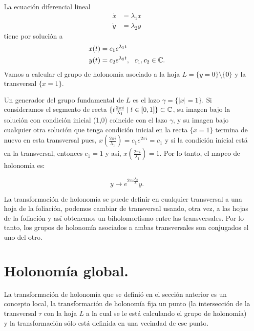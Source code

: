 \begin{Ejemplo}
\label{Ej:HolonomiaLineal}
La ecuación diferencial lineal
\begin{equation*}
\begin{aligned}
\dot{x} &= \lambda_{1}x\\
\dot{y} &= \lambda_{2}y
\end{aligned}
\end{equation*}
tiene por solución a 
\begin{equation*}
\begin{aligned}
x(t) &= c_{1}e^{\lambda_{1}t}\\
y(t) &= c_{2}e^{\lambda_{2}t},\ \  c_{1},c_{2}\in\mathbb{C}.
\end{aligned}
\end{equation*}
Vamos a calcular el grupo de holonomía asociado a la hoja $L=\{y=0\}\setminus\{0\}$ y la transversal $\{x=1\}$.

Un generador del grupo fundamental de $L$ es el lazo $\gamma=\{\left|x\right| = 1\}$. Si consideramos el segmento de recta $\{t\tfrac{2\pi i}{\lambda_{1}} \mid t\in[0,1]\}\subset\mathbb{C}$, su imagen bajo la solución con condición inicial (1,0) coincide con el lazo $\gamma$, y su imagen bajo cualquier otra solución que tenga condición inicial en la recta $\{x=1\}$ termina de nuevo en esta transversal pues, $x(\tfrac{2\pi i}{\lambda_{1}})=c_{1}e^{2\pi i}=c_{1}$ y si la condición inicial está en la transversal, entonces $c_{1}=1$ y así, $x(\tfrac{2\pi i}{\lambda_{1}})=1$. Por lo tanto, el mapeo de holonomía es: 

\begin{equation}
y \mapsto e^{2\pi i \frac{\lambda_{2}}{\lambda_{1}}}y.
\end{equation}   
\end{Ejemplo}

La transformación de holonomía se puede definir en cualquier transversal a una hoja de la foliación, podemos cambiar de transversal usando, otra vez, a las hojas de la foliación y así obtenemos un biholomorfismo entre las transversales. Por lo tanto, los grupos de holonomía asociados a ambas transversales son conjugados el uno del otro. 

\section{Holonomía global.}
\label{Sec:HolonomiaGlobal}
La transformación de holonomía que se definió en el sección anterior es un concepto local, la transformación de holonomía fija un punto (la intersección de la transversal $\tau$ con la hoja  $L$ a la cual se le está calculando el grupo de holonomía) y la transformación sólo está definida en una vecindad de ese punto.\\

